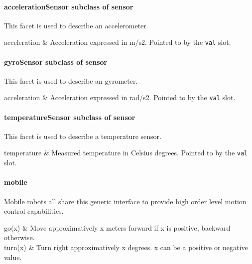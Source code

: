 \paragraph{ accelerationSensor  \textmd{subclass of sensor}}

This facet is used to describe an accelerometer.

\begin{slots}
acceleration &
Acceleration expressed in m/s2.
Pointed to by the \texttt{val} slot.\\\hline
\end{slots}

\paragraph{gyroSensor  \textmd{subclass of sensor}}

This facet is used to describe an gyrometer.

\begin{slots}
acceleration &
Acceleration expressed in rad/s2.
Pointed to by the \texttt{val} slot.\\\hline
\end{slots}

\paragraph{ temperatureSensor  \textmd{subclass of sensor}}


This facet is used to describe a temperature sensor.

\begin{slots}
temperature &
Measured temperature in Celsius degrees.
Pointed to by the \texttt{val} slot.\\\hline
\end{slots}

\paragraph{mobile}

Mobile robots all share this generic interface to provide high order
level motion control capabilities.

\begin{slots}
go(x) &
Move approximatively x meters forward
if x is positive, backward otherwise.\\\hline
turn(x) &
Turn right approximatively x degrees.
x can be a positive or negative value.\\\hline
\end{slots}

